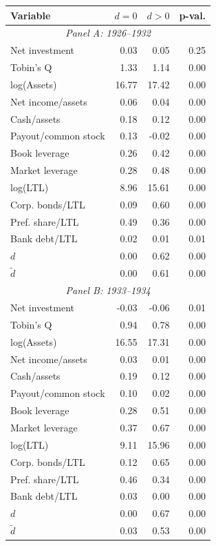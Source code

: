 \begin{threeparttable}
\begin{tabular}{lrrr}
\toprule
Variable & \ensuremath{d=0} & \ensuremath{d>0} & p-val. \\
\midrule
\multicolumn{4}{c}{\textit{Panel A: 1926--1932}} \\
\midrule
Net investment & 0.03 & 0.05 & 0.25 \\
Tobin's Q & 1.33 & 1.14 & 0.00 \\
log(Assets) & 16.77 & 17.42 & 0.00 \\
Net income/assets & 0.06 & 0.04 & 0.00 \\
Cash/assets & 0.18 & 0.12 & 0.00 \\
Payout/common stock & 0.13 & -0.02 & 0.00 \\
Book leverage & 0.26 & 0.42 & 0.00 \\
Market leverage & 0.28 & 0.48 & 0.00 \\
log(LTL) & 8.96 & 15.61 & 0.00 \\
Corp. bonds/LTL & 0.09 & 0.60 & 0.00 \\
Pref. share/LTL & 0.49 & 0.36 & 0.00 \\
Bank debt/LTL & 0.02 & 0.01 & 0.01 \\
\ensuremath{d} & 0.00 & 0.62 & 0.00 \\
\ensuremath{\tilde{d}} & 0.00 & 0.61 & 0.00 \\
\midrule
\multicolumn{4}{c}{\textit{Panel B: 1933--1934}} \\
\midrule
Net investment & -0.03 & -0.06 & 0.01 \\
Tobin's Q & 0.94 & 0.78 & 0.00 \\
log(Assets) & 16.55 & 17.31 & 0.00 \\
Net income/assets & 0.03 & 0.01 & 0.00 \\
Cash/assets & 0.19 & 0.12 & 0.00 \\
Payout/common stock & 0.10 & 0.02 & 0.00 \\
Book leverage & 0.28 & 0.51 & 0.00 \\
Market leverage & 0.37 & 0.67 & 0.00 \\
log(LTL) & 9.11 & 15.96 & 0.00 \\
Corp. bonds/LTL & 0.12 & 0.65 & 0.00 \\
Pref. share/LTL & 0.46 & 0.34 & 0.00 \\
Bank debt/LTL & 0.03 & 0.00 & 0.00 \\
\ensuremath{d} & 0.00 & 0.67 & 0.00 \\
\ensuremath{\tilde{d}} & 0.03 & 0.53 & 0.00 \\

\end{tabular}
\end{threeparttable}
